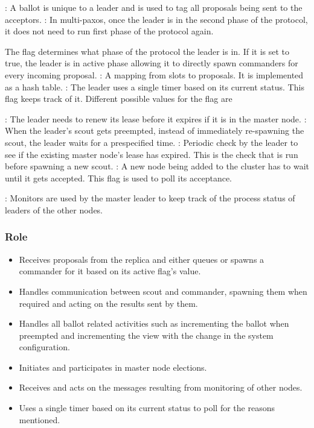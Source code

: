 \begin{itemize}
    : A ballot is unique to a leader and is used to tag all
    proposals being sent to the acceptors.
    : In multi-paxos, once the leader is in the second phase of
    the protocol, it does not need to run first phase of the protocol again.

    The  flag determines what phase of the protocol the leader is
    in.
    If it is set to true, the leader is in active phase allowing it to directly
    spawn commanders for every incoming proposal.
    : A mapping from slots to proposals. It is implemented as
    a hash table.
    : The leader uses a single timer based on its current
    status. This flag keeps track of it. Different possible values for the flag
    are
    \begin{itemize}
        : The leader needs to renew its lease before it expires if
        it is in the master node.
        : When the leader's scout gets preempted, instead of
        immediately re-spawning the scout, the leader waits for a prespecified
         time.
        : Periodic check by the leader to see if the
        existing master node's lease has expired. This is the check that is run
        before spawning a new scout.
        : A new node being added to the cluster has to wait
        until it gets accepted. This flag is used to poll its acceptance.
    \end{itemize}
    : Monitors are used by the master leader to keep track of
    the process status of leaders of the other nodes.
\end{itemize}

\subsubsection{Role}

\begin{itemize}
  \item Receives proposals from the replica and either queues or spawns a
    commander for it based on its active flag's value.
  \item Handles communication between scout and commander, spawning them
    when required and acting on the results sent by them.
  \item Handles all ballot related activities such as incrementing the ballot
    when preempted and incrementing the view with the change in the system
    configuration.
  \item Initiates and participates in master node elections.
  \item Receives and acts on the messages resulting from monitoring of other
    nodes.
  \item Uses a single timer based on its current status to poll for the
    reasons mentioned.
\end{itemize}


